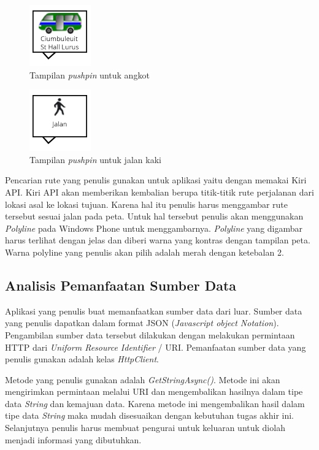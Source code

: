 \begin{figure}[h]
	\centering
		\includegraphics[scale=0.5]{Gambar/out_kiri/angkot}
	\caption{Tampilan \textit{pushpin} untuk angkot}
	\label{fig:pushpin_angkot}
\end{figure}

\begin{figure}[h]
	\centering
		\includegraphics[scale=0.5]{Gambar/out_kiri/jalan}
	\caption{Tampilan \textit{pushpin} untuk jalan kaki}
	\label{fig:pushpin_jalan}
\end{figure}

Pencarian rute yang penulis gunakan untuk aplikasi yaitu dengan memakai Kiri API. Kiri API akan memberikan kembalian berupa titik-titik rute perjalanan dari lokasi asal ke lokasi tujuan. Karena hal itu penulis harus menggambar rute tersebut sesuai jalan pada peta. Untuk hal tersebut penulis akan menggunakan \textit{Polyline} pada Windows Phone untuk menggambarnya. \textit{Polyline} yang digambar harus terlihat dengan jelas dan diberi warna yang kontras dengan tampilan peta. Warna polyline yang penulis akan pilih adalah merah dengan ketebalan 2.

\subsection{Analisis Pemanfaatan Sumber Data}
\label{lab:Analisis Pemanfaatan Sumber Data}
\hspace{0.5cm} Aplikasi yang penulis buat memanfaatkan sumber data dari luar. Sumber data yang penulis dapatkan dalam format JSON (\textit{Javascript object Notation}). Pengambilan sumber data tersebut dilakukan dengan melakukan permintaan HTTP dari \textit{Uniform Resource Identifier} / URI. Pemanfaatan sumber data yang penulis gunakan adalah kelas \textit{HttpClient}.

Metode yang penulis gunakan adalah \textit{GetStringAsync()}. Metode ini akan mengirimkan permintaan melalui URI dan mengembalikan hasilnya dalam tipe data \textit{String} dan kemajuan data. Karena metode ini mengembalikan hasil dalam tipe data \textit{String} maka mudah disesuaikan dengan kebutuhan tugas akhir ini. Selanjutnya penulis harus membuat pengurai untuk keluaran  untuk diolah menjadi informasi yang dibutuhkan.   

